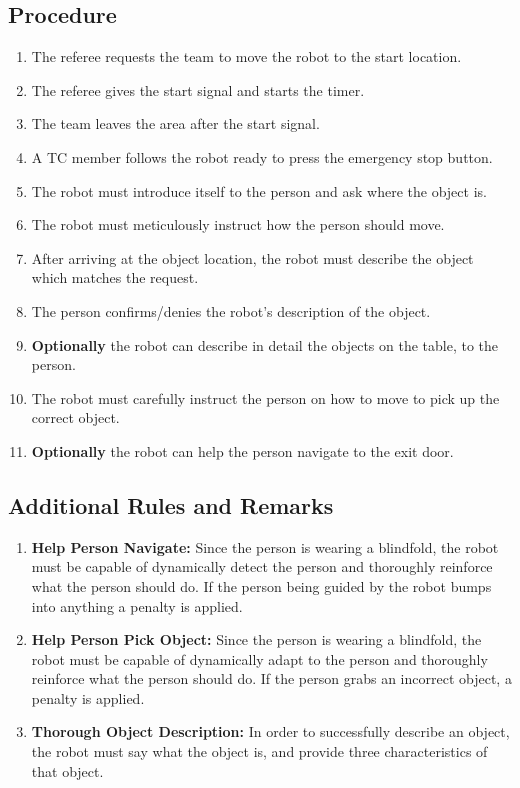 \subsection*{Procedure}
	\begin{enumerate}[nosep]
		\item The referee requests the team to move the robot to the start location.
		\item The referee gives the start signal and starts the timer.
		\item The team leaves the area after the start signal.
		\item A TC member follows the robot ready to press the emergency stop button.
		\item The robot must introduce itself to the person and ask where the object is.
		\item The robot must meticulously instruct how the person should move. 
		\item After arriving at the object location, the robot must describe the object which matches the request.
		\item The person confirms/denies the robot's description of the object.
		\item \textbf{Optionally} the robot can describe in detail the objects on the table, to the person.
		\item The robot must carefully instruct the person on how to move to pick up the correct object. 
		\item \textbf{Optionally} the robot can help the person navigate to the exit door.
	\end{enumerate}

\subsection*{Additional Rules and Remarks}
\begin{enumerate}[nosep]

	\item \textbf{Help Person Navigate:} Since the person is wearing a blindfold, the robot must be capable of dynamically detect the person and thoroughly reinforce what the person should do. If the person being guided by the robot bumps into anything a penalty is applied.
	\item \textbf{Help Person Pick Object:} Since the person is wearing a blindfold, the robot must be capable of dynamically adapt to the person and thoroughly reinforce what the person should do. If the person grabs an incorrect object, a penalty is applied.
	\item \textbf{Thorough Object Description:} In order to successfully describe an object, the robot must say what the object is, and provide three characteristics of that object.

\end{enumerate}

